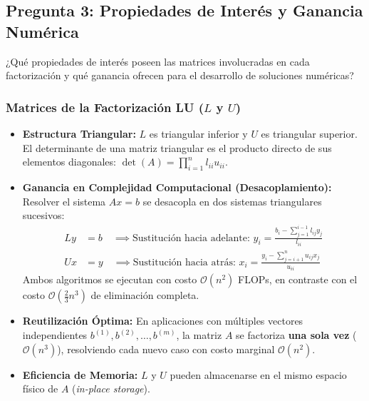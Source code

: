 \documentclass[11pt,a4paper]{article}
\theoremstyle{definition}
\theoremstyle{remark}
\begin{document}
\subsection{Pregunta 3: Propiedades de Interés y Ganancia Numérica}

\begin{solbox}[Pregunta 3]
¿Qué propiedades de interés poseen las matrices involucradas en cada factorización y qué ganancia ofrecen para el desarrollo de soluciones numéricas?
\end{solbox}

\subsubsection{Matrices de la Factorización LU ($L$ y $U$)}
\begin{itemize}[leftmargin=*]
    \item \textbf{Estructura Triangular:} $L$ es triangular inferior y $U$ es triangular superior. El determinante de una matriz triangular es el producto directo de sus elementos diagonales: $\det(A) = \prod_{i=1}^n l_{ii} u_{ii}$.
    \item \textbf{Ganancia en Complejidad Computacional (Desacoplamiento):} Resolver el sistema $Ax = b$ se desacopla en dos sistemas triangulares sucesivos:
    \begin{align}
        L y &= b \quad \implies \text{Sustitución hacia adelante: } y_i = \frac{b_i - \sum_{j=1}^{i-1} l_{ij} y_j}{l_{ii}} \\
        U x &= y \quad \implies \text{Sustitución hacia atrás: } x_i = \frac{y_i - \sum_{j=i+1}^n u_{ij} x_j}{u_{ii}}
    \end{align}
    Ambos algoritmos se ejecutan con costo $\mathcal{O}(n^2)$ FLOPs, en contraste con el costo $\mathcal{O}\left(\frac{2}{3}n^3\right)$ de eliminación completa.
    \item \textbf{Reutilización Óptima:} En aplicaciones con múltiples vectores independientes $b^{(1)}, b^{(2)}, \dots, b^{(m)}$, la matriz $A$ se factoriza \textbf{una sola vez} ($\mathcal{O}(n^3)$), resolviendo cada nuevo caso con costo marginal $\mathcal{O}(n^2)$.
    \item \textbf{Eficiencia de Memoria:} $L$ y $U$ pueden almacenarse en el mismo espacio físico de $A$ (\textit{in-place storage}).
\end{itemize}
\end{document}
